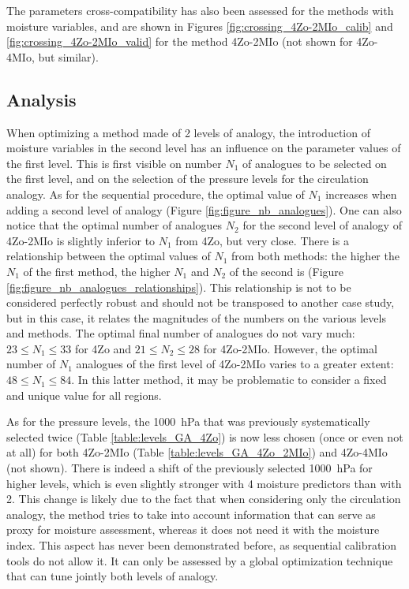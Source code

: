 \documentclass[5p]{elsarticle}
\begin{document}
The parameters cross-compatibility has also been assessed for the methods with moisture variables, and are shown in Figures \ref{fig:crossing_4Zo-2MIo_calib} and \ref{fig:crossing_4Zo-2MIo_valid} for the method 4Zo-2MIo (not shown for 4Zo-4MIo, but similar).


\subsection{Analysis}

When optimizing a method made of 2 levels of analogy, the introduction of moisture variables in the second level has an influence on the parameter values of the first level. This is first visible on number $N_{1}$ of analogues to be selected on the first level, and on the selection of the pressure levels for the circulation analogy. As for the sequential procedure, the optimal value of $N_{1}$ increases when adding a second level of analogy (Figure \ref{fig:figure_nb_analogues}). One can also notice that the optimal number of analogues $N_{2}$ for the second level of analogy of 4Zo-2MIo is slightly inferior to $N_{1}$ from 4Zo, but very close. There is a relationship between the optimal values of $N_{1}$ from both methods: the higher the $N_{1}$ of the first method, the higher $N_{1}$ and $N_{2}$ of the second is (Figure \ref{fig:figure_nb_analogues_relationships}). This relationship is not to be considered perfectly robust and should not be transposed to another case study, but in this case, it relates the magnitudes of the numbers on the various levels and methods. The optimal final number of analogues do not vary much: $23 \leq N_{1} \leq 33$ for 4Zo and $21 \leq N_{2} \leq 28$ for 4Zo-2MIo. However, the optimal number of $N_{1}$ analogues of the first level of 4Zo-2MIo varies to a greater extent: $48 \leq N_{1} \leq 84$. In this latter method, it may be problematic to consider a fixed and unique value for all regions.

As for the pressure levels, the 1000~hPa that was previously systematically selected twice (Table \ref{table:levels_GA_4Zo}) is now less chosen (once or even not at all) for both 4Zo-2MIo (Table \ref{table:levels_GA_4Zo_2MIo}) and 4Zo-4MIo (not shown). There is indeed a shift of the previously selected 1000~hPa for higher levels, which is even slightly stronger with 4 moisture predictors than with 2. This change is likely due to the fact that when considering only the circulation analogy, the method tries to take into account information that can serve as proxy for moisture assessment, whereas it does not need it with the moisture index. This aspect has never been demonstrated before, as sequential calibration tools do not allow it. It can only be assessed by a global optimization technique that can tune jointly both levels of analogy. 
\end{document}
